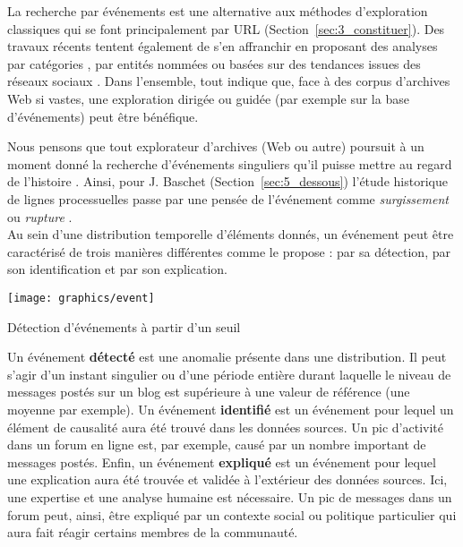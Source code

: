 \documentclass[symmetric,justified,marginals=raggedouter]{tufte-book}
\begin{document}
La recherche par événements est une alternative aux méthodes d'ex\-ploration classiques qui se font principalement par URL (Section~\ref{sec:3_constituer}). Des travaux récents tentent également de s'en affranchir en proposant des analyses par catégories \citep{holzmann_tempas:_2016}, par entités nommées \citep{spaniol_tracking_2012} ou basées sur des tendances issues des réseaux sociaux \citep{risse_arcomem_2014}. Dans l'ensemble, tout indique que, face à des corpus d'archives Web si vastes, une exploration dirigée ou guidée (par exemple sur la base d'événements) peut être bénéfique. 

Nous pensons que tout explorateur d'archives (Web ou autre) poursuit à un moment donné la recherche d'événements singuliers qu'il puisse mettre au regard de l'histoire \citep{chaney_who_2015}. Ainsi, pour J. Baschet (Section~\ref{sec:5_dessous}) l'étude historique de lignes processuelles passe par une pensée de l'évé\-nement comme \og\textit{surgissement}\fg{} ou \og\textit{rupture}\fg{} \citep[p.227]{baschet_defaire_2018}.\\ 

\noindent Au sein d'une distribution temporelle d'éléments donnés, un événement peut être caractérisé de trois manières différentes comme le propose \citep[p.106]{viard_link_2016} : par sa détection, par son identification et par son explication. 

\begin{marginfigure}%
  \texttt{[image: graphics/event]}
  \vspace*{0.2cm}  
  \caption{Détection d'événements à partir d'un seuil}
  \label{fig:event}
\end{marginfigure}

Un événement \textbf{détecté} est une anomalie présente dans une distribution. Il peut s'agir d'un instant singulier ou d'une période entière durant laquelle le niveau de messages postés sur un blog est supérieure à une valeur de référence (une moyenne par exemple). Un événement \textbf{identifié} est un événement pour lequel un élément de causalité aura été trouvé dans les données sources. Un pic d'activité dans un forum en ligne est, par exemple, causé par un nombre important de messages postés. Enfin, un événement \textbf{expliqué} est un événement pour lequel une explication aura été trouvée et validée à l'extérieur des données sources. Ici, une expertise et une analyse humaine est nécessaire. Un pic de messages dans un forum peut, ainsi, être expliqué par un contexte social ou politique particulier qui aura fait réagir certains membres de la communauté.  
\end{document}
